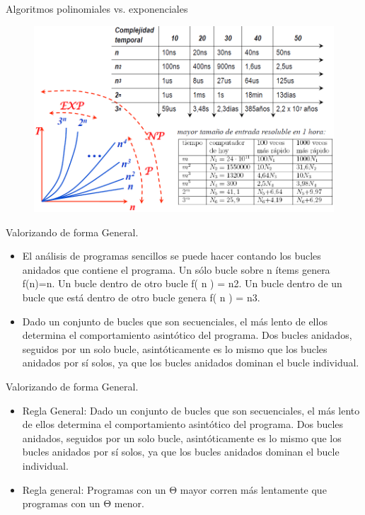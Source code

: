 \documentclass{beamer} %
\begin{document}
\begin{frame}{Algoritmos polinomiales vs. exponenciales}
  \begin{figure}[h]
    \includegraphics[width=\textwidth]{./image/cap1/EXP.png}
  \end{figure}
\end{frame}

\begin{frame}{Valorizando de forma General.}
  \begin{itemize}
    \item El análisis de programas sencillos se puede hacer contando los bucles anidados que contiene el programa. Un sólo bucle sobre n ítems genera f(n)=n. Un bucle dentro de otro bucle f( n ) = n2. Un bucle dentro de un bucle que está dentro de otro bucle genera f( n ) = n3.
    \item Dado un conjunto de bucles que son secuenciales, el más lento de ellos determina el comportamiento asintótico del programa. Dos bucles anidados, seguidos por un solo bucle, asintóticamente es lo mismo que los bucles anidados por sí solos, ya que los bucles anidados dominan el bucle individual.
    \end{itemize}
\end{frame}

\begin{frame}{Valorizando de forma General.}
  \begin{itemize}
    \item Regla General: Dado un conjunto de bucles que son secuenciales, el más lento de ellos determina el comportamiento asintótico del programa. Dos bucles anidados, seguidos por un solo bucle, asintóticamente es lo mismo que los bucles anidados por sí solos, ya que los bucles anidados dominan el bucle individual.
    \item Regla general: Programas con un Θ mayor corren más lentamente que programas con un Θ menor.
  \end{itemize}
\end{frame}
\end{document}

